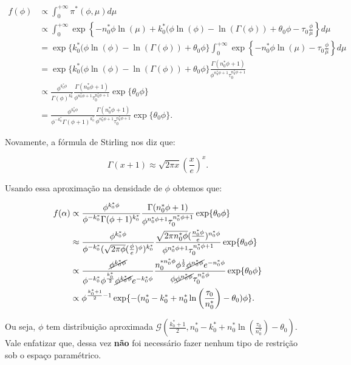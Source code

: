 \documentclass[
]{article}
\begin{document}
\[
\begin{aligned}
f(\phi)&\propto \int_0^{+\infty}\pi^*(\phi,\mu) d\mu\\
&\propto \int_0^{+\infty}\exp\left\{-n^*_0\phi \ln(\mu)+k^*_0(\phi\ln(\phi)-\ln(\Gamma(\phi))+\theta_0\phi-\tau_0\frac{\phi}{\mu}\right\}d\mu\\
&= \exp\{k^*_0(\phi\ln(\phi)-\ln(\Gamma(\phi))+\theta_0\phi\}\int_0^{+\infty}\exp\left\{-n^*_0\phi \ln(\mu)-\tau_0\frac{\phi}{\mu}\right\}d\mu\\
&= \exp\{k^*_0(\phi\ln(\phi)-\ln(\Gamma(\phi))+\theta_0\phi\}\frac{\Gamma(n^*_0\phi+1)}{\phi^{n^*_0\phi+1}\tau_0^{n^*_0\phi+1}}\\
&\propto \frac{\phi^{k^*_0\phi}}{\Gamma(\phi)^{k^*_0}}\frac{\Gamma(n^*_0\phi+1)}{\phi^{n^*_0\phi+1}\tau_0^{n^*_0\phi+1}}\exp\{\theta_0\phi\}\\
&= \frac{\phi^{k^*_0\phi}}{\phi^{-k^*_0}\Gamma(\phi+1)^{k^*_0}}\frac{\Gamma(n^*_0\phi+1)}{\phi^{n^*_0\phi+1}\tau_0^{n^*_0\phi+1}}\exp\{\theta_0\phi\}.
 \end{aligned}
\]

Novamente, a fórmula de Stirling nos diz que:

\[
\Gamma(x+1) \approx \sqrt{2\pi x}\left(\frac{x}{e}\right)^x.
\]

Usando essa aproximação na densidade de \(\phi\) obtemos que:

\[
\begin{aligned}
f(\alpha)&\propto \frac{\phi^{k^*_0\phi}}{\phi^{-k^*_0}\Gamma(\phi+1)^{k^*_0}}\frac{\Gamma(n^*_0\phi+1)}{\phi^{n^*_0\phi+1}\tau_0^{n^*_0\phi+1}}\exp\{\theta_0\phi\}\\
&\approx \frac{\phi^{k^*_0\phi}}{\phi^{-k^*_0}(\sqrt{2\pi\phi}(\frac{\phi}{e})^{\phi})^{k^*_0}}\frac{\sqrt{2\pi n^*_0\phi}(\frac{n^*_0\phi}{e})^{n^*_0\phi}}{\phi^{n^*_0\phi+1}\tau_0^{n^*_0\phi+1}}\exp\{\theta_0\phi\}\\
&\propto \frac{\cancel{\phi^{k^*_0\phi}}}{\phi^{-k^*_0}\phi^{\frac{k^*_0}{2}}\cancel{\phi^{k_0^*\phi}}e^{-k_0^*\phi}}\frac{n_0^{*n^*_0\phi}\phi^{\frac{1}{2}}\cancel{\phi^{n_0^*\phi}} e^{-n^*_0\phi}}{\phi\cancel{\phi^{n^*_0\phi}}\tau_0^{n^*_0\phi}}\exp\{\theta_0\phi\}\\
&\propto \phi^{\frac{k_0^*+1}{2}-1}\exp\{-(n_0^*-k_0^*+n_0^*\ln\left(\frac{\tau_0}{n^*_0}\right)-\theta_0)\phi\}.
\end{aligned}
\]

Ou seja, \(\phi\) tem distribuição aproximada
\(\mathcal{G}\left(\frac{k^*_0+1}{2},n_0^*-k_0^*+n_0^*\ln\left(\frac{\tau_0}{n^*_0}\right)-\theta_0\right)\).
Vale enfatizar que, dessa vez \textbf{não} foi necessário fazer nenhum
tipo de restrição sob o espaço paramétrico.
\end{document}
